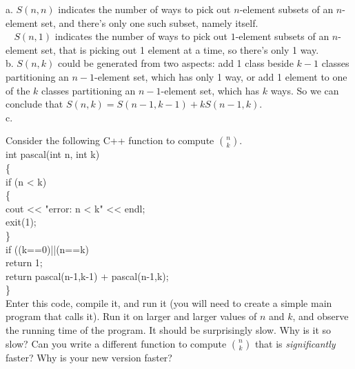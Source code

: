 \documentclass[11pt, a4paper, UTF8]{ctexart}
\begin{document}
\begin{solution}
  a. $S(n,n)$ indicates the number of ways to pick out $n$-element subsets of an 
  $n$-element set, and there's only one such subset, namely itself. \\
  $~~~~S(n,1)$ indicates the number of ways to pick out $1$-element subsets of an 
  $n$-element set, that is picking out 1 element at a time, so there's only 1 way.\\
  b. $S(n,k)$ could be generated from two aspects: add 1 class beside $k-1$ classes 
  partitioning an $n-1$-element set, which has only 1 way, or add 1 element to one 
  of the $k$ classes partitioning an $n-1$-element set, which has $k$ ways. So we 
  can conclude that $S(n,k) = S(n-1,k-1) + kS(n-1,k)$.\\
  c. 
\end{solution}

\begin{problem}[CS: 1.5.14]
  Consider the following C++ function to compute $\binom{n}{k}$.\\
  \indent int pascal(int n, int k)\\
  \indent \{\\
  \indent \indent if (n < k)\\
  \indent \indent \{\\
  \indent \indent \indent cout << "error: n < k" << endl;\\
  \indent \indent \indent exit(1);\\
  \indent \indent \}\\
  \indent \indent if ((k==0)||(n==k)\\
  \indent \indent \indent return 1;\\
  \indent \indent return pascal(n-1,k-1) + pascal(n-1,k);\\
  \indent \}\\
  Enter this code, compile it, and run it (you will need to create a simple main 
  program that calls it). Run it on larger and larger values of $n$ and $k$, and 
  observe the running time of the program. It should be surprisingly slow. Why is 
  it so slow? Can you write a different function to compute $\binom{n}{k}$ that is 
  \textsl{significantly} faster? Why is your new version faster?
\end{problem}
\end{document}
